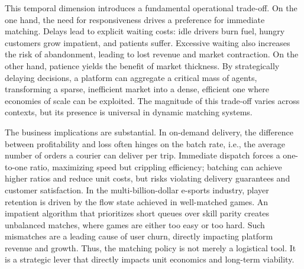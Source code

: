 This temporal dimension introduces a fundamental operational trade-off.
On the one hand, the need for responsiveness drives a preference for immediate matching.
Delays lead to explicit waiting costs: idle drivers burn fuel, hungry customers grow impatient, and patients suffer.
Excessive waiting also increases the risk of abandonment, leading to lost revenue and market contraction.
On the other hand, patience yields the benefit of market thickness.
By strategically delaying decisions, a platform can aggregate a critical mass of agents, transforming a sparse, inefficient market into a dense, efficient one where economies of scale can be exploited.
The magnitude of this trade-off varies across contexts, but its presence is universal in dynamic matching systems.

The business implications are substantial.
In on-demand delivery, the difference between profitability and loss often hinges on the batch rate, i.e., the average number of orders a courier can deliver per trip.
Immediate dispatch forces a one-to-one ratio, maximizing speed but crippling efficiency; batching can achieve higher ratios and reduce unit costs, but risks violating delivery guarantees and customer satisfaction.
In the multi-billion-dollar e-sports industry, player retention is driven by the flow state achieved in well-matched games.
An impatient algorithm that prioritizes short queues over skill parity creates unbalanced matches, where games are either too easy or too hard.
Such mismatches are a leading cause of user churn, directly impacting platform revenue and growth.
Thus, the matching policy is not merely a logistical tool.
It is a strategic lever that directly impacts unit economics and long-term viability.

